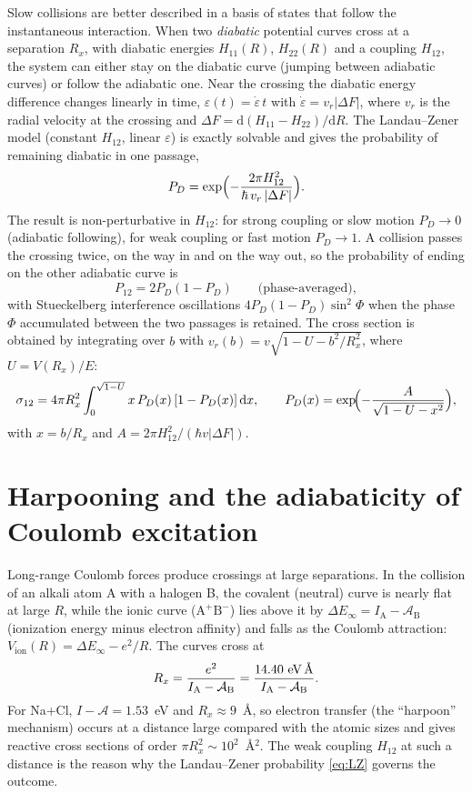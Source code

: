 \documentclass[11pt,a4paper]{book}
\numberwithin{equation}{chapter}
\newcommand{\dd}{\mathrm{d}}
\begin{document}
Slow collisions are better described in a basis of states that follow the
instantaneous interaction. When two \emph{diabatic} potential curves cross at a
separation $R_x$, with diabatic energies $H_{11}(R)$, $H_{22}(R)$ and a coupling
$H_{12}$, the system can either stay on the diabatic curve (jumping between
adiabatic curves) or follow the adiabatic one. Near the crossing the diabatic
energy difference changes linearly in time, $\varepsilon(t)=\dot\varepsilon\,t$
with $\dot\varepsilon=v_r|\Delta F|$, where $v_r$ is the radial velocity at the
crossing and $\Delta F=\dd(H_{11}-H_{22})/\dd R$. The Landau--Zener model
(constant $H_{12}$, linear $\varepsilon$) is exactly solvable and gives the
probability of remaining diabatic in one passage,
\begin{equation}\label{eq:LZ}
  P_D=\exp\Bigl(-\frac{2\pi H_{12}^2}{\hbar\,v_r\,|\Delta F|}\Bigr).
\end{equation}
The result is non-perturbative in $H_{12}$: for strong coupling or slow motion
$P_D\to0$ (adiabatic following), for weak coupling or fast motion $P_D\to1$. A
collision passes the crossing twice, on the way in and on the way out, so the
probability of ending on the other adiabatic curve is
\begin{equation}\label{eq:LZ2}
  P_{12}=2P_D(1-P_D)\qquad\text{(phase-averaged)},
\end{equation}
with Stueckelberg interference oscillations $4P_D(1-P_D)\sin^2\Phi$ when the phase
$\Phi$ accumulated between the two passages is retained. The cross section is
obtained by integrating over $b$ with $v_r(b)=v\sqrt{1-U-b^2/R_x^2}$, where
$U=V(R_x)/E$:
\begin{equation}\label{eq:sigLZ}
  \sigma_{12}=4\pi R_x^2\int_0^{\sqrt{1-U}}x\,P_D(x)\,[1-P_D(x)]\,\dd x,\qquad
  P_D(x)=\exp\!\Bigl(-\frac{A}{\sqrt{1-U-x^2}}\Bigr),
\end{equation}
with $x=b/R_x$ and $A=2\pi H_{12}^2/(\hbar v|\Delta F|)$.

\section{Harpooning and the adiabaticity of Coulomb excitation}

Long-range Coulomb forces produce crossings at large separations. In the
collision of an alkali atom A with a halogen B, the covalent (neutral) curve is
nearly flat at large $R$, while the ionic curve ($\mathrm A^+\mathrm B^-$) lies above
it by $\Delta E_\infty=I_{\mathrm A}-\mathcal A_{\mathrm B}$ (ionization energy minus
electron affinity) and falls as the Coulomb attraction:
$V_{\mathrm{ion}}(R)=\Delta E_\infty-e^2/R$. The curves cross at
\begin{equation}\label{eq:harpoon}
  R_x=\frac{e^2}{I_{\mathrm A}-\mathcal A_{\mathrm B}}=\frac{14.40\ \text{eV\,\AA}}{I_{\mathrm A}-\mathcal A_{\mathrm B}} .
\end{equation}
For Na+Cl, $I-\mathcal A=1.53$~eV and $R_x\approx9$~\AA, so electron transfer
(the ``harpoon'' mechanism) occurs at a distance large compared with the atomic
sizes and gives reactive cross sections of order $\pi R_x^2\sim10^2$~\AA$^2$.
The weak coupling $H_{12}$ at such a distance is the reason why the
Landau--Zener probability \eqref{eq:LZ} governs the outcome.
\end{document}
